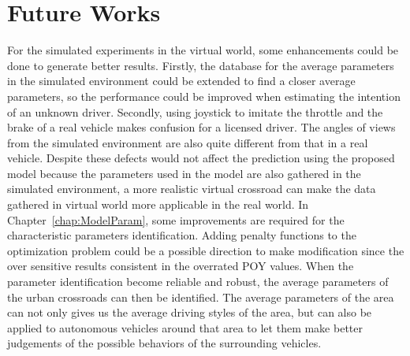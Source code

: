 \section{Future Works}
\label{sec:futureWorks}

For the simulated experiments in the virtual world, some enhancements could be done to generate better results. Firstly, the database for the average parameters in the simulated environment could be extended to find a closer average parameters, so the performance could be improved when estimating the intention of an unknown driver. Secondly, using joystick to imitate the throttle and the brake of a real vehicle makes confusion for a licensed driver. The angles of views from the simulated environment are also quite different from that in a real vehicle. Despite these defects would not affect the prediction using the proposed model because the parameters used in the model are also gathered in the simulated environment, a more realistic virtual crossroad can make the data gathered in virtual world more applicable in the real world. 
In Chapter~\ref{chap:ModelParam}, some improvements are required for the characteristic parameters identification. Adding penalty functions to the optimization problem could be a possible direction to make modification since the over sensitive results consistent in the overrated POY values. When the parameter identification become reliable and robust, the average parameters of the urban crossroads can then be identified. The average parameters of the area can not only gives us the average driving styles of the area, but can also be applied to autonomous vehicles around that area to let them make better judgements of the possible behaviors of the surrounding vehicles.